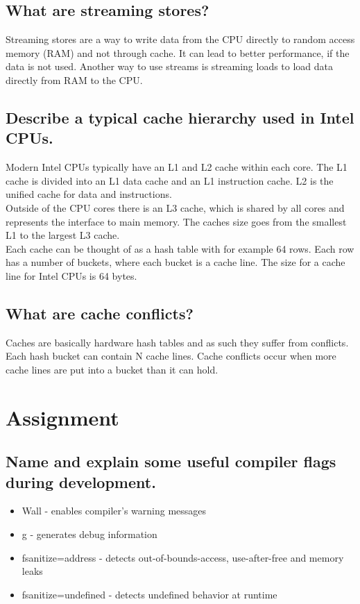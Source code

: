 \documentclass[runningheads]{llncs}
\begin{document}
\subsection{What are streaming stores?}
Streaming stores are a way to write data from the CPU directly to random access memory (RAM) and not through cache.
It can lead to better performance, if the data is not used.
Another way to use streams is streaming loads to load data directly from RAM to the CPU.

\subsection{Describe a typical cache hierarchy used in Intel CPUs.}
Modern Intel CPUs typically have an L1 and L2 cache within each core. 
The L1 cache is divided into an L1 data cache and an L1 instruction cache.
L2 is the unified cache for data and instructions. \\
Outside of the CPU cores there is an L3 cache, which is shared by all cores and represents the interface to main memory.
The caches size goes from the smallest L1 to the largest L3 cache.
\\
Each cache can be thought of as a hash table with for example 64 rows. Each row has a number of buckets,
where each bucket is a cache line. The size for a cache line for Intel CPUs is 64 bytes.


\subsection{What are cache conflicts?}
Caches are basically hardware hash tables and as such they suffer from conflicts.
Each hash bucket can contain N cache lines.
Cache conflicts occur when more cache lines are put into a bucket than it can hold.


\section{Assignment}

\subsection{Name and explain some useful compiler flags during development.}
\begin{itemize}
	\item Wall - enables compiler's warning messages
	\item g - generates debug information
	\item fsanitize=address - detects out-of-bounds-access, use-after-free and memory leaks
	\item fsanitize=undefined - detects undefined behavior at runtime
\end{itemize}
\end{document}

